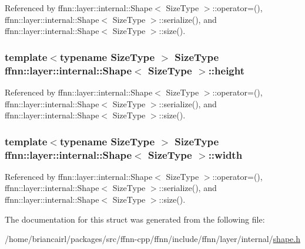 Referenced by ffnn\-::layer\-::internal\-::\-Shape$<$ Size\-Type $>$\-::operator=(), ffnn\-::layer\-::internal\-::\-Shape$<$ Size\-Type $>$\-::serialize(), and ffnn\-::layer\-::internal\-::\-Shape$<$ Size\-Type $>$\-::size().

\hypertarget{structffnn_1_1layer_1_1internal_1_1_shape_ac48f7c8b470265b0f886393e32dab4e7}{
\subsubsection[{height}]{\setlength{\rightskip}{0pt plus 5cm}template$<$typename Size\-Type $>$ Size\-Type {\bf ffnn\-::layer\-::internal\-::\-Shape}$<$ Size\-Type $>$\-::height}}\label{structffnn_1_1layer_1_1internal_1_1_shape_ac48f7c8b470265b0f886393e32dab4e7}


Referenced by ffnn\-::layer\-::internal\-::\-Shape$<$ Size\-Type $>$\-::operator=(), ffnn\-::layer\-::internal\-::\-Shape$<$ Size\-Type $>$\-::serialize(), and ffnn\-::layer\-::internal\-::\-Shape$<$ Size\-Type $>$\-::size().

\hypertarget{structffnn_1_1layer_1_1internal_1_1_shape_ae8155a14b907ad1af92d108d5d77e12c}{
\subsubsection[{width}]{\setlength{\rightskip}{0pt plus 5cm}template$<$typename Size\-Type $>$ Size\-Type {\bf ffnn\-::layer\-::internal\-::\-Shape}$<$ Size\-Type $>$\-::width}}\label{structffnn_1_1layer_1_1internal_1_1_shape_ae8155a14b907ad1af92d108d5d77e12c}


Referenced by ffnn\-::layer\-::internal\-::\-Shape$<$ Size\-Type $>$\-::operator=(), ffnn\-::layer\-::internal\-::\-Shape$<$ Size\-Type $>$\-::serialize(), and ffnn\-::layer\-::internal\-::\-Shape$<$ Size\-Type $>$\-::size().



The documentation for this struct was generated from the following file\-:\begin{DoxyCompactItemize}
\item 
/home/briancairl/packages/src/ffnn-\/cpp/ffnn/include/ffnn/layer/internal/\hyperlink{shape_8h}{shape.\-h}\end{DoxyCompactItemize}
